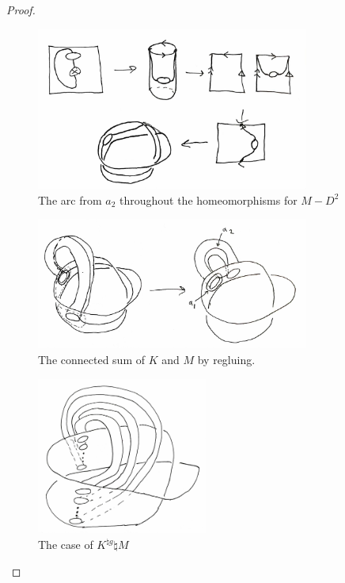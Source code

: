 \documentclass[reqno]{amsart}
\theoremstyle{definition}
\theoremstyle{remark}
\begin{document}
\begin{proof}
\begin{figure}[htpb]
    \centering
    \includegraphics[width=0.8\textwidth]{part2-deformation-curve.jpg}
    \caption{The arc from $a_2$ throughout the homeomorphisms
    for $M-D^2$}
    \label{fig:part2-deformation-curve-jpg}
\end{figure}

\begin{figure}[htpb]
    \centering
    \includegraphics[width=0.8\textwidth]{klein-to-torus-curve.jpg}
    \caption{The connected sum
    of $K$ and $M$ by regluing.}
    \label{fig:klein-to-torus-curve-jpg}
\end{figure}

\begin{figure}[htpb]
    \centering
    \includegraphics[width=0.5\textwidth]{many-klein-torus-curve.jpg}
    \caption{The case of $K^{\natural g} \natural M$}
    \label{fig:many-klein-torus-curve-jpg}
\end{figure}

\end{proof}
\end{document}
